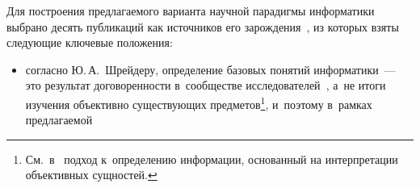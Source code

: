 \begin{multicols}{2}
  Для построения предлагаемого варианта научной парадигмы информатики 
выбрано десять пуб\-ли\-ка\-ций как источников его  
зарождения~\cite{16-zac, 18-zac, 19-zac, 20-zac, 21-zac, 22-zac, 23-zac, 24-zac, 25-zac, 26-zac}, из которых взяты следующие ключевые по\-ло\-же\-ния:
  \begin{itemize}
\item  согласно Ю.\,А.~Шрейдеру, определение базовых понятий информатики~--- это результат 
договоренности в~сообществе исследователей~\cite{16-zac}, а~не итоги изучения объективно существующих 
предметов\footnote{См.\ в~\cite{17-zac} подход к~определению информации, основанный на интерпретации 
объективных сущностей.}, и~поэтому в~рамках предлагаемой\linebreak\vspace*{-12pt}
\end{itemize}

\pagebreak


\end{multicols}
